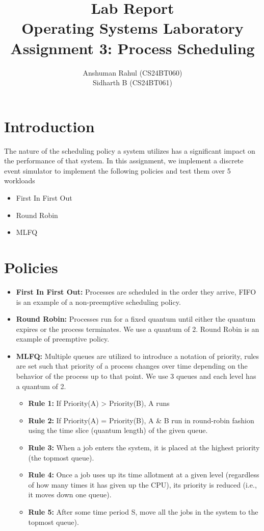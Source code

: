 \documentclass[12pt]{article}
\title{\textbf{Lab Report} \\ Operating Systems Laboratory \\ Assignment 3: Process Scheduling}
\author{Anshuman Rahul (CS24BT060) \\ Sidharth B (CS24BT061)}
\date{}
\begin{document}
\maketitle
\section{Introduction}
The nature of the scheduling policy a system utilizes has a significant impact on the performance of that system. In this assignment, we implement a discrete event simulator to implement the following policies and test them over 5 workloads
\begin{itemize}
    \item First In First Out
    \item Round Robin
    \item MLFQ
\end{itemize}

\section{Policies}
\begin{itemize}
    \item{
        \textbf{First In First Out:} Processes are scheduled in the order they arrive, FIFO is an example of a non-preemptive scheduling policy.  
    }
    \item{
        \textbf{Round Robin:} Processes run for a fixed quantum until either the quantum expires or the process terminates. We use a quantum of 2. Round Robin is an example of preemptive policy. 
    } 
    \item{
        \textbf{MLFQ:} Multiple queues are utilized to introduce a notation of priority, rules are set such that priority of a process changes over time depending on the behavior of the process up to that point. We use 3 queues and each level has a quantum of 2.
        \begin{itemize}
            \item{
                \textbf{Rule 1:} If Priority(A) \textgreater{} Priority(B), A runs
            }
            \item{
                \textbf{Rule 2:} If Priority(A) = Priority(B), A \& B run in round-robin fashion using the time slice (quantum length) of the given queue.
            }
            \item{
                \textbf{Rule 3:} When a job enters the system, it is placed at the highest priority (the topmost queue). 
            }
            \item{
                \textbf{Rule 4:} Once a job uses up its time allotment at a given level (regardless of how many times it has given up the CPU), its priority is reduced (i.e., it moves down one queue).
            }
            \item{
                \textbf{Rule 5:} After some time period S, move all the jobs in the system to the topmost queue).
            }
        \end{itemize}
    } 


\end{itemize}
\end{document}
